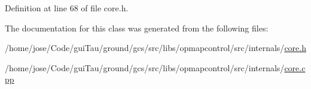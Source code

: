 Definition at line 68 of file core.\-h.



The documentation for this class was generated from the following files\-:\begin{DoxyCompactItemize}
\item 
/home/jose/\-Code/gui\-Tau/ground/gcs/src/libs/opmapcontrol/src/internals/\hyperlink{core_8h}{core.\-h}\item 
/home/jose/\-Code/gui\-Tau/ground/gcs/src/libs/opmapcontrol/src/internals/\hyperlink{core_8cpp}{core.\-cpp}\end{DoxyCompactItemize}
